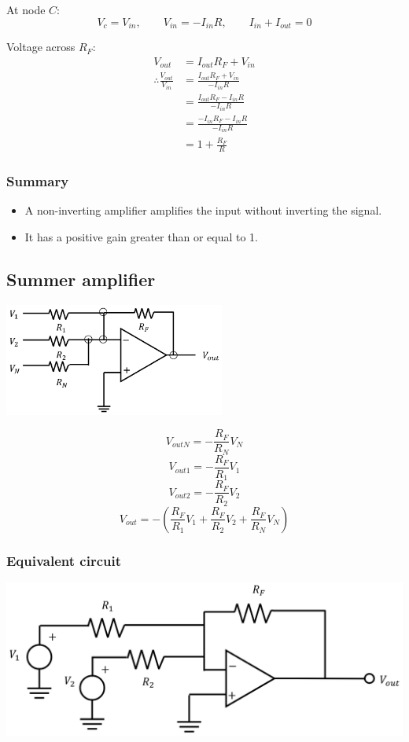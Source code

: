 \documentclass[11pt]{article}
\begin{document}
At node \(C\):
\[V_c = V_{in}, \qquad V_{in} = - I_{in} R, \qquad I_{in} + I_{out} = 0\]

Voltage across \(R_F\):
\begin{align*}
V_{out} &= I_{out} R_F + V_{in} \\
\therefore \frac{V_{out}}{V_{in}} &= \frac{I_{out} R_F + V_{in}}{-I_{in} R} \\
&= \frac{I_{out} R_F - I_{in} R}{- I_{in} R} \\
&= \frac{- I_{in} R_F - I_{in} R}{- I_{in} R} \\
&= 1 + \frac{R_F}{R}
\end{align*}
\subsubsection{Summary}
\label{sec:org092f30a}
\begin{itemize}
\item A non-inverting amplifier amplifies the input without inverting the signal.
\item It has a positive gain greater than or equal to 1.
\end{itemize}
\subsection{Summer amplifier}
\label{sec:orgb30d4ba}
\begin{center}
\includegraphics[height=10em]{./images/summer-amplifier-adder-circuit.png}
\end{center}

\[V_{outN} = - \frac{R_F}{R_N} V_N\]
\[V_{out1} = - \frac{R_F}{R_1} V_1\]
\[V_{out2} = - \frac{R_F}{R_2} V_2\]
\[V_{out} = - \left(\frac{R_F}{R_1} V_1 + \frac{R_F}{R_2} V_2 + \frac{R_F}{R_N} V_N \right)\]
\subsubsection{Equivalent circuit}
\label{sec:org58ae50c}
\begin{center}
\includegraphics[width=.9\linewidth]{./images/summer-amplifier-equivalent-circuit.png}
\end{center}
\end{document}
